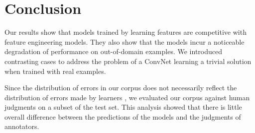 



\section{Conclusion}
\label{sec:PrepositionConclusion}

Our results show that models trained by learning features are competitive with feature engineering models. They also show that the models incur a noticeable degradation of performance on out-of-domain examples.  We introduced contrasting cases to address the problem of a ConvNet learning a trivial solution when trained with real examples.

Since the distribution of errors in our corpus does not necessarily reflect the distribution of errors made by learners \cite{rozovskaya2010generating}, we evaluated our corpus against human judgments on a subset of the test set.  This analysis showed that there is little overall difference between the predictions of the models and the judgments of annotators.  

